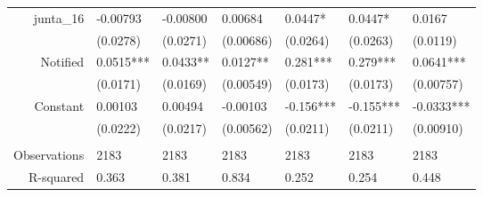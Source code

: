 \begin{tabular}{rrrrrrr}
junta\_16 & \multicolumn{1}{l}{-0.00793} & \multicolumn{1}{l}{-0.00800} & \multicolumn{1}{l}{0.00684} & \multicolumn{1}{l}{0.0447*} & \multicolumn{1}{l}{0.0447*} & \multicolumn{1}{l}{0.0167} \\
      & \multicolumn{1}{l}{(0.0278)} & \multicolumn{1}{l}{(0.0271)} & \multicolumn{1}{l}{(0.00686)} & \multicolumn{1}{l}{(0.0264)} & \multicolumn{1}{l}{(0.0263)} & \multicolumn{1}{l}{(0.0119)} \\
Notified & \multicolumn{1}{l}{0.0515***} & \multicolumn{1}{l}{0.0433**} & \multicolumn{1}{l}{0.0127**} & \multicolumn{1}{l}{0.281***} & \multicolumn{1}{l}{0.279***} & \multicolumn{1}{l}{0.0641***} \\
      & \multicolumn{1}{l}{(0.0171)} & \multicolumn{1}{l}{(0.0169)} & \multicolumn{1}{l}{(0.00549)} & \multicolumn{1}{l}{(0.0173)} & \multicolumn{1}{l}{(0.0173)} & \multicolumn{1}{l}{(0.00757)} \\
Constant  & \multicolumn{1}{l}{0.00103} & \multicolumn{1}{l}{0.00494} & \multicolumn{1}{l}{-0.00103} & \multicolumn{1}{l}{-0.156***} & \multicolumn{1}{l}{-0.155***} & \multicolumn{1}{l}{-0.0333***} \\
      & \multicolumn{1}{l}{(0.0222)} & \multicolumn{1}{l}{(0.0217)} & \multicolumn{1}{l}{(0.00562)} & \multicolumn{1}{l}{(0.0211)} & \multicolumn{1}{l}{(0.0211)} & \multicolumn{1}{l}{(0.00910)} \\
      & \multicolumn{1}{l}{} & \multicolumn{1}{l}{} & \multicolumn{1}{l}{} & \multicolumn{1}{l}{} & \multicolumn{1}{l}{} & \multicolumn{1}{l}{} \\
Observations & \multicolumn{1}{l}{2183} & \multicolumn{1}{l}{2183} & \multicolumn{1}{l}{2183} & \multicolumn{1}{l}{2183} & \multicolumn{1}{l}{2183} & \multicolumn{1}{l}{2183} \\
R-squared & \multicolumn{1}{l}{0.363} & \multicolumn{1}{l}{0.381} & \multicolumn{1}{l}{0.834} & \multicolumn{1}{l}{0.252} & \multicolumn{1}{l}{0.254} & \multicolumn{1}{l}{0.448} \\
\bottomrule
\end{tabular}%
